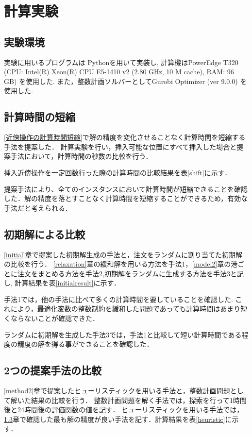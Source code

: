 \chapter{計算実験}\label{computational_result}
\section{実験環境}
実験に用いるプログラムは Pythonを用いて実装し, 計算機はPowerEdge T320 (CPU: Intel(R) Xeon(R) CPU E5-1410 v2 (2.80 GHz, 10 M cache), RAM: 96 GB) を使用した. また，整数計画ソルバーとしてGurobi Optimizer (ver 9.0.0) を使用した.

\section{計算時間の短縮}
\ref{近傍操作の計算時間短縮}で解の精度を変化させることなく計算時間を短縮する手法を提案した．
計算実験を行い，挿入可能な位置にすべて挿入した場合と提案手法において，計算時間の秒数の比較を行う．

挿入近傍操作を一定回数行った際の計算時間の比較結果を表\ref{shift}に示す．

提案手法により、全てのインスタンスにおいて計算時間が短縮できることを確認した．解の精度を落とすことなく計算時間を短縮することができるため，有効な手法だと考えられる．

\section{初期解による比較}
\label{sectioninitial}
\ref{initial}章で提案した初期解生成の手法と，注文をランダムに割り当てた初期解の比較を行う．
\ref{relaxation}章の緩和解を用いる方法を手法1，\ref{model2}章の港ごとに注文をまとめる方法を手法2,初期解をランダムに生成する方法を手法3と記し, 計算結果を表\ref{initialresult}に示す．

手法1では，他の手法に比べて多くの計算時間を要していることを確認した. これにより，最適化変数の整数制約を緩和した問題であっても計算時間はあまり短くならないことが確認できた．

ランダムに初期解を生成した手法3では，手法1と比較して短い計算時間である程度の精度の解を得る事ができることを確認した．


\section{2つの提案手法の比較}
\ref{method2}章で提案したヒューリスティックを用いる手法と，整数計画問題として解いた結果の比較を行う．
整数計画問題を解く手法では，探索を行って1時間後と24時間後の評価関数の値を記す．
ヒューリスティックを用いる手法では，\ref{sectioninitial}章で確認した最も解の精度が良い手法を記す．計算結果を表\ref{heuristic}に示す．

